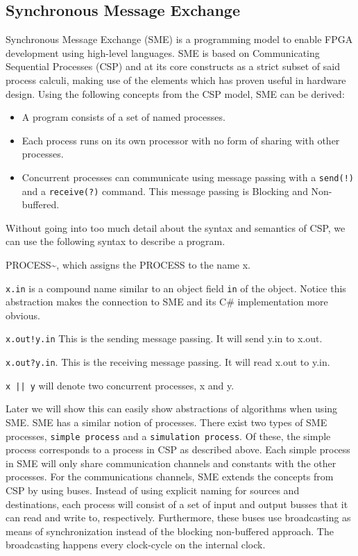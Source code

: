 \documentclass[a4paper]{article}
\begin{document}
\subsection{Synchronous Message Exchange}
\label{sec:org9c10d27}
Synchronous Message Exchange (SME) is a programming model to enable FPGA development using high-level languages. SME is based on Communicating Sequential Processes (CSP) and at its core constructs as a strict subset of said process calculi, making use of the elements which has proven useful in hardware design\cite{sme}. Using the following concepts from the CSP model, SME can be derived:
\begin{itemize}
\item A program consists of a set of named processes.
\item Each process runs on its own processor with no form of sharing with other processes.
\item Concurrent processes can communicate using message passing with a \texttt{send(!)} and a \texttt{receive(?)} command. This message passing is Blocking and Non-buffered.
\end{itemize}
Without going into too much detail about the syntax and semantics of CSP\cite{CSP}, we can use the following syntax to describe a program.
\begin{description}
\item[{\textasciitilde{}x}] PROCESS\textasciitilde{}, which assigns the PROCESS to the name x.
\item \texttt{x.in} is a compound name similar to an object field \texttt{in} of the object. Notice this abstraction makes the connection to SME and its C\# implementation more obvious.
\item \texttt{x.out!y.in} This is the sending message passing. It will send y.in to x.out.
\item \texttt{x.out?y.in}. This is the receiving message passing. It will read x.out to y.in.
\item \texttt{x || y} will denote two concurrent processes, x and y.
\end{description}
Later we will show this can easily show abstractions of algorithms when using SME. SME has a similar notion of processes. There exist two types of SME processes, \texttt{simple process} and a \texttt{simulation process}. Of these, the simple process corresponds to a process in CSP as described above. Each simple process in SME will only share communication channels and constants with the other processes. For the communications channels, SME extends the concepts from CSP by using buses. Instead of using explicit naming for sources and destinations, each process will consist of a set of input and output busses that it can read and write to, respectively. Furthermore, these buses use broadcasting as means of synchronization instead of the blocking non-buffered approach.  The broadcasting happens every clock-cycle on the internal clock.
\end{document}
